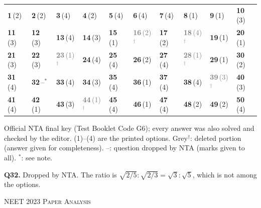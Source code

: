 {\small\setlength{\tabcolsep}{1pt}\renewcommand{\arraystretch}{1.5}
\begin{tabularx}{\linewidth}{@{}*{10}{>{\centering\arraybackslash}X}@{}}\toprule
\textbf{1}\,(2) & \textbf{2}\,(2) & \textbf{3}\,(4) & \textbf{4}\,(2) & \textbf{5}\,(4) & \textbf{6}\,(4) & \textbf{7}\,(4) & \textbf{8}\,(1) & \textbf{9}\,(1) & \textbf{10}\,(3)\\
\textbf{11}\,(3) & \textbf{12}\,(3) & \textbf{13}\,(4) & \textbf{14}\,(3) & \textbf{15}\,(1) & \textcolor{gray}{\textbf{16}\,(2)$^{\dagger}$} & \textbf{17}\,(2) & \textcolor{gray}{\textbf{18}\,(4)$^{\dagger}$} & \textbf{19}\,(1) & \textbf{20}\,(1)\\
\textbf{21}\,(3) & \textbf{22}\,(3) & \textcolor{gray}{\textbf{23}\,(1)$^{\dagger}$} & \textbf{24}\,(4) & \textbf{25}\,(4) & \textbf{26}\,(2) & \textbf{27}\,(4) & \textcolor{gray}{\textbf{28}\,(1)$^{\dagger}$} & \textbf{29}\,(1) & \textbf{30}\,(2)\\
\textbf{31}\,(4) & \textbf{32}\,--$^{*}$ & \textbf{33}\,(4) & \textbf{34}\,(3) & \textbf{35}\,(4) & \textbf{36}\,(1) & \textbf{37}\,(4) & \textbf{38}\,(4) & \textcolor{gray}{\textbf{39}\,(3)$^{\dagger}$} & \textbf{40}\,(3)\\
\textbf{41}\,(4) & \textbf{42}\,(1) & \textbf{43}\,(3) & \textcolor{gray}{\textbf{44}\,(1)$^{\dagger}$} & \textbf{45}\,(4) & \textbf{46}\,(1) & \textbf{47}\,(4) & \textbf{48}\,(2) & \textbf{49}\,(2) & \textbf{50}\,(4)\\\bottomrule\end{tabularx}}\par\smallskip
{\footnotesize Official NTA final key (Test Booklet Code G6); every answer was also solved and checked by the editor. (1)--(4) are the printed options. {\color{gray}Grey$^{\dagger}$}: deleted portion (answer given for completeness). --: question dropped by NTA (marks given to all). $^{*}$: see note.\par
\par\smallskip\textbf{Q32.} Dropped by NTA. The ratio is $\sqrt{2/5}:\sqrt{2/3}=\sqrt3:\sqrt5$, which is not among the options.
}\par
\clearpage
\begin{center}{}\par
{\fontsize{20}{24}\selectfont\color{navy}\scshape NEET 2023 \textperiodcentered{} Paper Analysis}\par
{\color{gilt}}\end{center}
